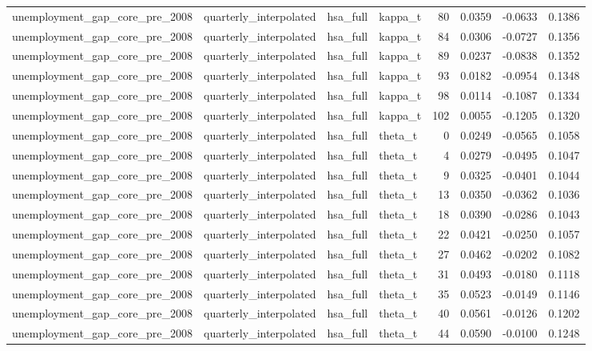 \begin{tabular}{llllrrrr}
unemployment\_gap\_core\_pre\_2008 & quarterly\_interpolated & hsa\_full & kappa\_t & 80 & 0.0359 & -0.0633 & 0.1386 \\
unemployment\_gap\_core\_pre\_2008 & quarterly\_interpolated & hsa\_full & kappa\_t & 84 & 0.0306 & -0.0727 & 0.1356 \\
unemployment\_gap\_core\_pre\_2008 & quarterly\_interpolated & hsa\_full & kappa\_t & 89 & 0.0237 & -0.0838 & 0.1352 \\
unemployment\_gap\_core\_pre\_2008 & quarterly\_interpolated & hsa\_full & kappa\_t & 93 & 0.0182 & -0.0954 & 0.1348 \\
unemployment\_gap\_core\_pre\_2008 & quarterly\_interpolated & hsa\_full & kappa\_t & 98 & 0.0114 & -0.1087 & 0.1334 \\
unemployment\_gap\_core\_pre\_2008 & quarterly\_interpolated & hsa\_full & kappa\_t & 102 & 0.0055 & -0.1205 & 0.1320 \\
unemployment\_gap\_core\_pre\_2008 & quarterly\_interpolated & hsa\_full & theta\_t & 0 & 0.0249 & -0.0565 & 0.1058 \\
unemployment\_gap\_core\_pre\_2008 & quarterly\_interpolated & hsa\_full & theta\_t & 4 & 0.0279 & -0.0495 & 0.1047 \\
unemployment\_gap\_core\_pre\_2008 & quarterly\_interpolated & hsa\_full & theta\_t & 9 & 0.0325 & -0.0401 & 0.1044 \\
unemployment\_gap\_core\_pre\_2008 & quarterly\_interpolated & hsa\_full & theta\_t & 13 & 0.0350 & -0.0362 & 0.1036 \\
unemployment\_gap\_core\_pre\_2008 & quarterly\_interpolated & hsa\_full & theta\_t & 18 & 0.0390 & -0.0286 & 0.1043 \\
unemployment\_gap\_core\_pre\_2008 & quarterly\_interpolated & hsa\_full & theta\_t & 22 & 0.0421 & -0.0250 & 0.1057 \\
unemployment\_gap\_core\_pre\_2008 & quarterly\_interpolated & hsa\_full & theta\_t & 27 & 0.0462 & -0.0202 & 0.1082 \\
unemployment\_gap\_core\_pre\_2008 & quarterly\_interpolated & hsa\_full & theta\_t & 31 & 0.0493 & -0.0180 & 0.1118 \\
unemployment\_gap\_core\_pre\_2008 & quarterly\_interpolated & hsa\_full & theta\_t & 35 & 0.0523 & -0.0149 & 0.1146 \\
unemployment\_gap\_core\_pre\_2008 & quarterly\_interpolated & hsa\_full & theta\_t & 40 & 0.0561 & -0.0126 & 0.1202 \\
unemployment\_gap\_core\_pre\_2008 & quarterly\_interpolated & hsa\_full & theta\_t & 44 & 0.0590 & -0.0100 & 0.1248 \\

\end{tabular}
